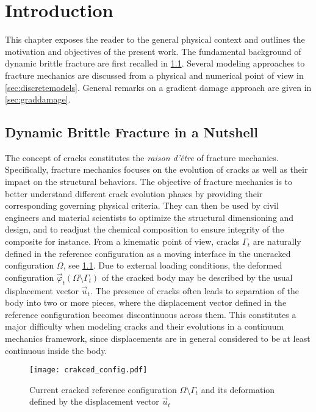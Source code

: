 \chapter{Introduction} \label{chap:introduction}
\minitoc

This chapter exposes the reader to the general physical context and outlines the motivation and objectives of the present work. The fundamental background of dynamic brittle fracture are first recalled in \cref{sec:dynafrac}. Several modeling approaches to fracture mechanics are discussed from a physical and numerical point of view in \cref{sec:discretemodels}. General remarks on a gradient damage approach are given in \cref{sec:graddamage}.

\section{Dynamic Brittle Fracture in a Nutshell} \label{sec:dynafrac}
The concept of cracks constitutes the \emph{raison d'être} of fracture mechanics. Specifically, fracture mechanics focuses on the evolution of cracks as well as their impact on the structural behaviors. The objective of fracture mechanics is to better understand different crack evolution phases by providing their corresponding governing physical criteria. They can then be used by civil engineers and material scientists to optimize the structural dimensioning and design, and to readjust the chemical composition to ensure integrity of the composite for instance. From a kinematic point of view, cracks $\Gamma_t$ are naturally defined in the reference configuration as a moving interface in the uncracked configuration $\Omega$, see \cref{fig:crackedconfig}. Due to external loading conditions, the deformed configuration $\vec{\varphi}_t(\Omega\setminus\Gamma_t)$ of the cracked body may be described by the usual displacement vector $\vec{u}_t$. The presence of cracks often leads to separation of the body into two or more pieces, where the displacement vector defined in the reference configuration becomes discontinuous across them. This constitutes a major difficulty when modeling cracks and their evolutions in a continuum mechanics framework, since displacements are in general considered to be at least continuous inside the body.
\begin{figure}[htbp]
\centering
\texttt{[image: crakced\_config.pdf]}
\caption{Current cracked reference configuration $\Omega\setminus\Gamma_t$ and  its deformation defined by the displacement vector $\vec{u}_t$} \label{fig:crackedconfig}
\end{figure}

